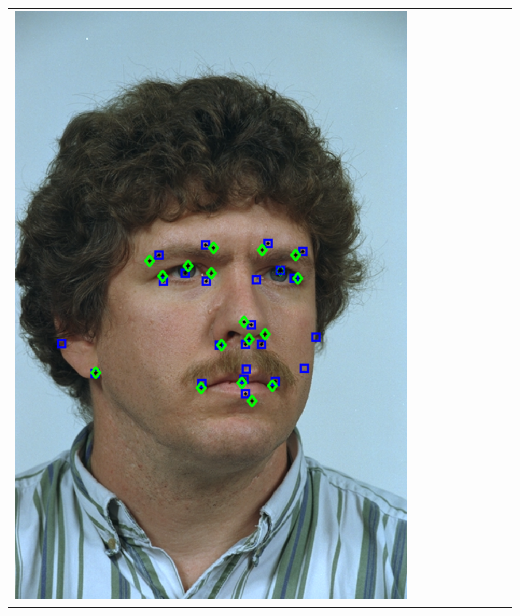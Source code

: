 \documentclass[portrait,final,a0paper,fontscale=0.277]{baposter}
\begin{document}
\begin{poster}
{{\begin{tabular}{@{}rccccccc@{}}
\parbox[c]{0.11\linewidth}{\includegraphics[width=\linewidth]{images/l_rc_success_1.pdf}} \\
&

\end{tabular}}}
\end{poster}
\end{document}
